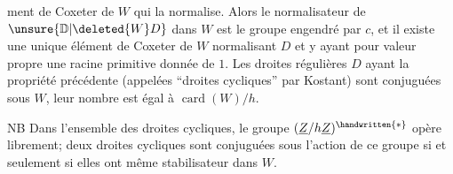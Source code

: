 ment de Coxeter de $W$ qui la normalise. Alors le normalisateur de $\unsure{\mathbb{D}|\deleted{W}D}$ dans $W$ est le groupe engendré par $c$, et il existe une unique élément de Coxeter de $W$ normalisant $D$ et y ayant pour valeur propre une racine primitive donnée de $1$. Les droites régulières $D$ ayant la propriété précédente (appelées ``droites cycliques'' par Kostant) sont conjuguées sous $W$, leur nombre est égal à $\operatorname{card}(W)/h$.

NB Dans l'ensemble des droites cycliques, le groupe $(\underline{Z}/h\underline{Z})^{\handwritten{*}}$ opère librement; deux droites cycliques sont conjuguées sous l'action de ce groupe si et seulement si elles ont même stabilisateur dans $W$.

